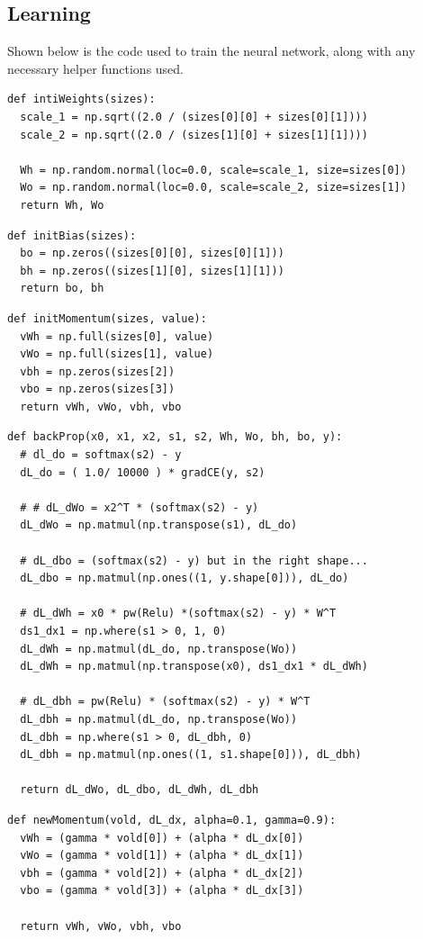 \documentclass[12pt]{article}
\begin{document}
\subsection{Learning}
Shown below is the code used to train the neural network, along with any necessary helper functions used.

\begin{verbatim}
def intiWeights(sizes):
  scale_1 = np.sqrt((2.0 / (sizes[0][0] + sizes[0][1])))
  scale_2 = np.sqrt((2.0 / (sizes[1][0] + sizes[1][1]))) 

  Wh = np.random.normal(loc=0.0, scale=scale_1, size=sizes[0])
  Wo = np.random.normal(loc=0.0, scale=scale_2, size=sizes[1])
  return Wh, Wo
\end{verbatim}

\begin{verbatim}
def initBias(sizes):
  bo = np.zeros((sizes[0][0], sizes[0][1]))
  bh = np.zeros((sizes[1][0], sizes[1][1]))
  return bo, bh
\end{verbatim}

\begin{verbatim}
def initMomentum(sizes, value):
  vWh = np.full(sizes[0], value)
  vWo = np.full(sizes[1], value) 
  vbh = np.zeros(sizes[2]) 
  vbo = np.zeros(sizes[3])
  return vWh, vWo, vbh, vbo 
\end{verbatim}

\begin{verbatim}
def backProp(x0, x1, x2, s1, s2, Wh, Wo, bh, bo, y):
  # dl_do = softmax(s2) - y
  dL_do = ( 1.0/ 10000 ) * gradCE(y, s2)

  # # dL_dWo = x2^T * (softmax(s2) - y)
  dL_dWo = np.matmul(np.transpose(s1), dL_do)

  # dL_dbo = (softmax(s2) - y) but in the right shape...
  dL_dbo = np.matmul(np.ones((1, y.shape[0])), dL_do)

  # dL_dWh = x0 * pw(Relu) *(softmax(s2) - y) * W^T
  ds1_dx1 = np.where(s1 > 0, 1, 0)
  dL_dWh = np.matmul(dL_do, np.transpose(Wo))
  dL_dWh = np.matmul(np.transpose(x0), ds1_dx1 * dL_dWh)

  # dL_dbh = pw(Relu) * (softmax(s2) - y) * W^T
  dL_dbh = np.matmul(dL_do, np.transpose(Wo))
  dL_dbh = np.where(s1 > 0, dL_dbh, 0)
  dL_dbh = np.matmul(np.ones((1, s1.shape[0])), dL_dbh)
 
  return dL_dWo, dL_dbo, dL_dWh, dL_dbh 
\end{verbatim}

\begin{verbatim}
def newMomentum(vold, dL_dx, alpha=0.1, gamma=0.9):
  vWh = (gamma * vold[0]) + (alpha * dL_dx[0])
  vWo = (gamma * vold[1]) + (alpha * dL_dx[1]) 
  vbh = (gamma * vold[2]) + (alpha * dL_dx[2]) 
  vbo = (gamma * vold[3]) + (alpha * dL_dx[3]) 

  return vWh, vWo, vbh, vbo 
\end{verbatim}
\end{document}
